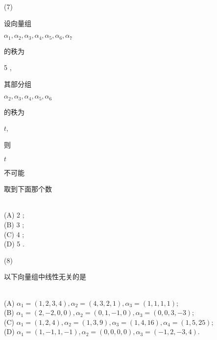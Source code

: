\documentclass[10pt]{article}
\begin{document}
(7) \begin{CJK}{UTF8}{mj}设向量组\end{CJK} $\alpha_{1}, \alpha_{2}, \alpha_{3}, \alpha_{4}, \alpha_{5}, \alpha_{6}, \alpha_{7}$ \begin{CJK}{UTF8}{mj}的秩为\end{CJK} 5 , \begin{CJK}{UTF8}{mj}其部分组\end{CJK} $\alpha_{2}, \alpha_{3}, \alpha_{4}, \alpha_{5}, \alpha_{6}$ \begin{CJK}{UTF8}{mj}的秩为\end{CJK} $t$, \begin{CJK}{UTF8}{mj}则\end{CJK} $t$ \begin{CJK}{UTF8}{mj}不可能\end{CJK} \begin{CJK}{UTF8}{mj}取到下面那个数\end{CJK}\\
(A) 2 ;\\
(B) 3 ;\\
(C) 4 ;\\
(D) 5 .

(8) \begin{CJK}{UTF8}{mj}以下向量组中线性无关的是\end{CJK}\\
(A) $\alpha_{1}=(1,2,3,4), \alpha_{2}=(4,3,2,1), \alpha_{3}=(1,1,1,1)$;\\
(B) $\alpha_{1}=(2,-2,0,0), \alpha_{2}=(0,1,-1,0), \alpha_{3}=(0,0,3,-3)$;\\
(C) $\alpha_{1}=(1,2,4), \alpha_{2}=(1,3,9), \alpha_{3}=(1,4,16), \alpha_{4}=(1,5,25)$;\\
(D) $\alpha_{1}=(1,-1,1,-1), \alpha_{2}=(0,0,0,0), \alpha_{3}=(-1,2,-3,4)$.
\end{document}

